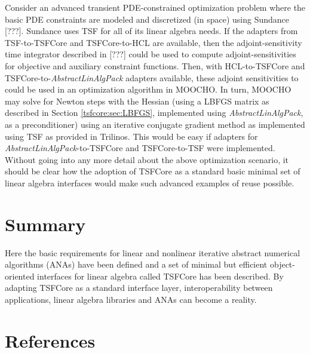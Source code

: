 \documentclass[10pt,fleqn]{article}
\begin{document}
Consider an advanced transient PDE-constrained optimization problem
where the basic PDE constraints are modeled and discretized (in
space) using Sundance [???].  Sundance uses TSF for all of its linear
algebra needs.  If the adapters from TSF-to-TSFCore and TSFCore-to-HCL are
available, then the adjoint-sensitivity time integrator described in
[???] could be used to compute adjoint-sensitivities for objective and
auxiliary constraint functions.  Then, with HCL-to-TSFCore and
TSFCore-to-\textit{AbstractLinAlgPack} adapters available, these adjoint
sensitivities to could be used in an optimization algorithm in MOOCHO.
In turn, MOOCHO may solve for Newton steps with the Hessian (using a
LBFGS matrix as described in Section \ref{tsfcore:sec:LBFGS}, implemented
using \textit{AbstractLinAlgPack}, as a preconditioner) using an
iterative conjugate gradient method as implemented using TSF as
provided in Trilinos.  This would be easy if adapters for
\textit{AbstractLinAlgPack}-to-TSFCore and TSFCore-to-TSF were implemented.
Without going into any more detail about the above optimization
scenario, it should be clear how the adoption of TSFCore as a standard
basic minimal set of linear algebra interfaces would make such
advanced examples of reuse possible.

%
\section{Summary}
%

Here the basic requirements for linear and nonlinear iterative
abstract numerical algorithms (ANAs) have been defined and a set of
minimal but efficient object-oriented interfaces for linear algebra
called TSFCore has been described.  By adapting TSFCore as a standard
interface layer, interoperability between applications,
linear algebra libraries and ANAs can become a reality.


{\bsinglespace  \section{References}
\nopagebreak  \esinglespace}
\end{document}
